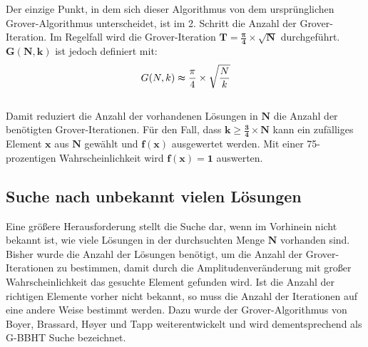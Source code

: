 Der einzige Punkt, in dem sich dieser Algorithmus von dem ursprünglichen Grover-Algorithmus unterscheidet, ist im 2. Schritt die Anzahl der Grover-Iteration. 
Im Regelfall wird die Grover-Iteration $\mathbf{T = \frac{\pmb\pi}{4} \times \sqrt{N}}$ durchgeführt. $\mathbf{G(N,k)}$ ist jedoch definiert mit:
\\
\begin{equation}
    {G(N,k) \thickapprox \frac{\pi}{4} \times \sqrt{\frac{N}{k}}}
\end{equation}
\\
Damit reduziert die Anzahl der vorhandenen Lösungen in $\mathbf{N}$ die Anzahl der benötigten Grover-Iterationen. 
Für den Fall, dass $\mathbf{k \geq \frac{3}{4} \times N}$ kann ein zufälliges Element $\mathbf{x}$ aus $\mathbf{N}$ gewählt und $\mathbf{f(x)}$ ausgewertet werden. 
Mit einer 75-prozentigen Wahrscheinlichkeit wird $\mathbf{f(x) = 1}$ auswerten.

\subsection{Suche nach unbekannt vielen Lösungen} \label{gbbht}
Eine größere Herausforderung stellt die Suche dar, wenn im Vorhinein nicht bekannt ist, wie viele Lösungen in der durchsuchten Menge $\mathbf{N}$ vorhanden sind. 
Bisher wurde die Anzahl der Lösungen benötigt, um die Anzahl der Grover-Iterationen zu bestimmen, damit durch die Amplitudenveränderung mit großer Wahrscheinlichkeit das gesuchte Element gefunden wird. 
Ist die Anzahl der richtigen Elemente vorher nicht bekannt, so muss die Anzahl der Iterationen auf eine andere Weise bestimmt werden. 
Dazu wurde der Grover-Algorithmus von Boyer, Brassard, Høyer und Tapp weiterentwickelt und wird dementsprechend als G-BBHT Suche bezeichnet.

